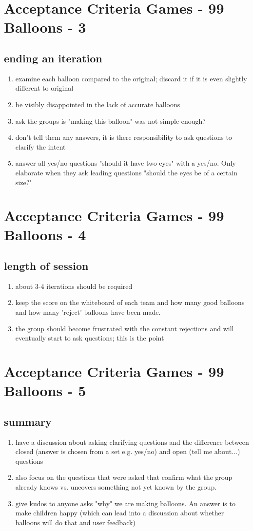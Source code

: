 \section*{Acceptance Criteria Games - 99 Balloons - 3}
\subsection*{ending an iteration}
\begin{enumerate}
\item examine each balloon compared to the original; discard it if it is even slightly different to original
\item be visibly disappointed in the lack of accurate balloons
\item ask the groups is "making this balloon" was not simple enough?
\item don't tell them any answers, it is there responsibility to ask questions to clarify the intent
\item answer all yes/no questions "should it have two eyes" with a yes/no. Only elaborate when they ask leading questions "should the eyes be of a certain size?"
\end{enumerate}
\clearpage
\section*{Acceptance Criteria Games - 99 Balloons - 4}
\subsection*{length of session}
\begin{enumerate}
\item about 3-4 iterations should be required
\item keep the score on the whiteboard of each team and how many good balloons and how many 'reject' balloons have been made.
\item the group should become frustrated with the constant rejections and will eventually start to ask questions; this is the point
\end{enumerate}
\clearpage
\section*{Acceptance Criteria Games - 99 Balloons - 5}
\subsection*{summary}
\begin{enumerate}
\item have a discussion about asking clarifying questions and the difference between closed (answer is chosen from a set e.g. yes/no) and open (tell me about...) questions
\item also focus on the questions that were asked that confirm what the group already knows vs. uncovers something not yet known by the group.
\item give kudos to anyone asks "why" we are making balloons. An answer is to make children happy (which can lead into a discussion about whether balloons will do that and user feedback)
\end{enumerate}
